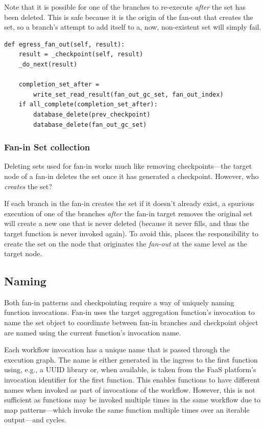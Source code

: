 Note that it is possible for one of the branches to re-execute \emph{after} the
set has been deleted. This is safe because it is the origin of the fan-out that
creates the set, so a branch's attempt to add itself to a, now, non-existent set
will simply fail.

\begin{verbatim}
def egress_fan_out(self, result):
    result = _checkpoint(self, result)
    _do_next(result)

    completion_set_after =
        write_set_read_result(fan_out_gc_set, fan_out_index)
    if all_complete(completion_set_after):
        database_delete(prev_checkpoint)
        database_delete(fan_out_gc_set)
\end{verbatim}

\subsubsection{Fan-in Set collection}

Deleting sets used for fan-in works much like removing checkpoints---the target
node of a fan-in deletes the set once it has generated a checkpoint. However,
who \emph{creates} the set?

If each branch in the fan-in creates the set if it doesn't already exist, a
spurious execution of one of the branches \emph{after} the fan-in target removes
the original set will create a new one that is never deleted (because it never
fills, and thus the target function is never invoked again). To avoid this,
\name{} places the responsibility to create the set on the node that originates
the \emph{fan-out} at the same level as the target node.

\subsection{Naming}\label{sec:design:naming}

Both fan-in patterns and checkpointing require a way of uniquely naming function
invocations. Fan-in uses the target aggregation function's invocation to name
the set object to coordinate between fan-in branches and checkpoint object
are named using the current function's invocation name.

Each workflow invocation has a unique name that is passed through the execution
graph. The name is either generated in the ingress to the first function using,
e.g., a UUID library or, when available, is taken from the FaaS platform's
invocation identifier for the first function. This enables functions to have
different names when invoked as part of invocations of the workflow. However,
this is not sufficient as functions may be invoked multiple times in the same
workflow due to map patterns---which invoke the same function multiple times over
an iterable output---and cycles.

